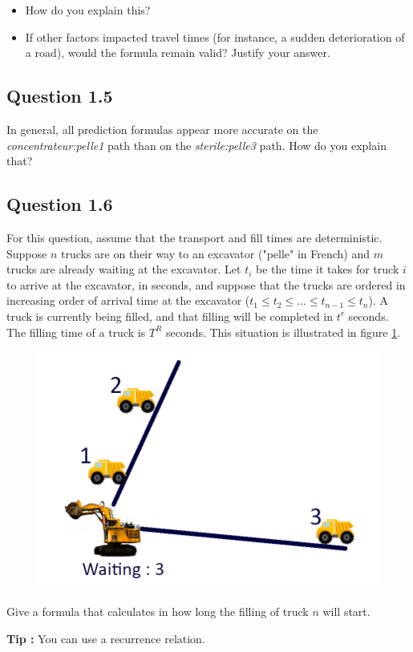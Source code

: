 \documentclass[letterpaper,12pt]{article}
\let\oldref\ref
\newcommand\myref[1]{\oldref{#1}}
\renewcommand{\ref}[1]{{\myref{#1}}}
\begin{document}
	\begin{itemize}
		\item How do you explain this? 
		\item If other factors impacted travel times (for instance, a sudden deterioration of a road), would the formula remain valid? Justify your answer.
	\end{itemize}

	\subsection*{Question 1.5}
	In general, all prediction formulas appear more accurate on the \textit{concentrateur:pelle1} path than on the \textit{sterile:pelle3} path. How do you explain that?
	
	\subsection*{Question 1.6}
	
	For this question, assume that the transport and fill times are deterministic. Suppose $n$ trucks are on their way to an excavator ("pelle" in French) and $m$ trucks are already waiting at the excavator. Let $t_i$ be the time it takes for truck $i$ to arrive at the excavator, in seconds, and suppose that the trucks are ordered in increasing order of arrival time at the excavator ($ t_1 \leq t_2 \leq ... \leq t_{n-1} \leq t_n $). A truck is currently being filled, and that filling will be completed in $ t^r $ seconds. The filling time of a truck is $ T^R $ seconds. This situation is illustrated in figure \ref{fig:file}.
	
	\begin{figure}
		\center
		\includegraphics[width=0.4\linewidth]{File_en.png}
		\caption{\label{fig:file} }
	\end{figure}
	
	\noindent Give a formula that calculates in how long the filling of truck $n$ will start.
	
	
	\noindent \textbf{Tip :} You can use a recurrence relation.
	
\end{document}
